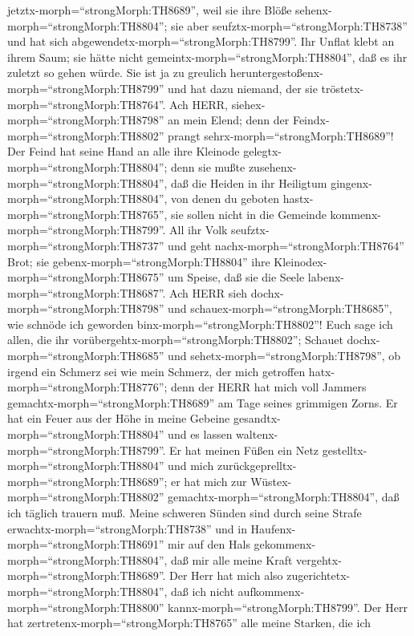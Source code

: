 jetztx-morph=``strongMorph:TH8689'', weil sie ihre Blöße
sehenx-morph=``strongMorph:TH8804''; sie aber
seufztx-morph=``strongMorph:TH8738'' und hat sich
abgewendetx-morph=``strongMorph:TH8799''.  Ihr Unflat klebt
an ihrem Saum; sie hätte nicht gemeintx-morph=``strongMorph:TH8804'',
daß es ihr zuletzt so gehen würde. Sie ist ja zu greulich
heruntergestoßenx-morph=``strongMorph:TH8799'' und hat dazu niemand, der
sie tröstetx-morph=``strongMorph:TH8764''. Ach HERR,
siehex-morph=``strongMorph:TH8798'' an mein Elend; denn der
Feindx-morph=``strongMorph:TH8802'' prangt
sehrx-morph=``strongMorph:TH8689''!  Der Feind hat seine
Hand an alle ihre Kleinode gelegtx-morph=``strongMorph:TH8804''; denn
sie mußte zusehenx-morph=``strongMorph:TH8804'', daß die Heiden in ihr
Heiligtum gingenx-morph=``strongMorph:TH8804'', von denen du geboten
hastx-morph=``strongMorph:TH8765'', sie sollen nicht in die Gemeinde
kommenx-morph=``strongMorph:TH8799''.  All ihr Volk
seufztx-morph=``strongMorph:TH8737'' und geht
nachx-morph=``strongMorph:TH8764'' Brot; sie
gebenx-morph=``strongMorph:TH8804'' ihre
Kleinodex-morph=``strongMorph:TH8675'' um Speise, daß sie die Seele
labenx-morph=``strongMorph:TH8687''. Ach HERR sieh
dochx-morph=``strongMorph:TH8798'' und
schauex-morph=``strongMorph:TH8685'', wie schnöde ich geworden
binx-morph=``strongMorph:TH8802''!  Euch sage ich allen,
die ihr vorübergehtx-morph=``strongMorph:TH8802''; Schauet
dochx-morph=``strongMorph:TH8685'' und
sehetx-morph=``strongMorph:TH8798'', ob irgend ein Schmerz sei wie mein
Schmerz, der mich getroffen hatx-morph=``strongMorph:TH8776''; denn der
HERR hat mich voll Jammers gemachtx-morph=``strongMorph:TH8689'' am Tage
seines grimmigen Zorns.  Er hat ein Feuer aus der Höhe in
meine Gebeine gesandtx-morph=``strongMorph:TH8804'' und es lassen
waltenx-morph=``strongMorph:TH8799''. Er hat meinen Füßen ein Netz
gestelltx-morph=``strongMorph:TH8804'' und mich
zurückgeprelltx-morph=``strongMorph:TH8689''; er hat mich zur
Wüstex-morph=``strongMorph:TH8802''
gemachtx-morph=``strongMorph:TH8804'', daß ich täglich trauern muß.
 Meine schweren Sünden sind durch seine Strafe
erwachtx-morph=``strongMorph:TH8738'' und in
Haufenx-morph=``strongMorph:TH8691'' mir auf den Hals
gekommenx-morph=``strongMorph:TH8804'', daß mir alle meine Kraft
vergehtx-morph=``strongMorph:TH8689''. Der Herr hat mich also
zugerichtetx-morph=``strongMorph:TH8804'', daß ich nicht
aufkommenx-morph=``strongMorph:TH8800''
kannx-morph=``strongMorph:TH8799''.  Der Herr hat
zertretenx-morph=``strongMorph:TH8765'' alle meine Starken, die ich
